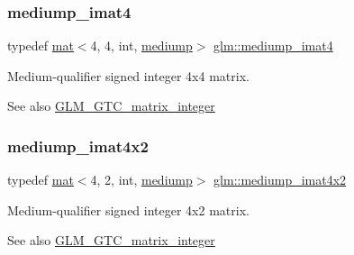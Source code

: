 \subsubsection{\texorpdfstring{mediump\+\_\+imat4}{mediump\_imat4}}
{\footnotesize\ttfamily typedef \mbox{\hyperlink{structglm_1_1mat}{mat}}$<$4, 4, int, \mbox{\hyperlink{namespaceglm_a36ed105b07c7746804d7fdc7cc90ff25a6416f3ea0c9025fb21ed50c4d6620482}{mediump}}$>$ \mbox{\hyperlink{group__gtc__matrix__integer_ga3ce415f7039ec7f1ad5bffa14d226e80}{glm\+::mediump\+\_\+imat4}}}

Medium-\/qualifier signed integer 4x4 matrix. \begin{DoxySeeAlso}{See also}
\mbox{\hyperlink{group__gtc__matrix__integer}{G\+L\+M\+\_\+\+G\+T\+C\+\_\+matrix\+\_\+integer}} 
\end{DoxySeeAlso}
\mbox{\label{group__gtc__matrix__integer_ga536fe339834f7e764672c22c63ec543b}} 
\subsubsection{\texorpdfstring{mediump\+\_\+imat4x2}{mediump\_imat4x2}}
{\footnotesize\ttfamily typedef \mbox{\hyperlink{structglm_1_1mat}{mat}}$<$4, 2, int, \mbox{\hyperlink{namespaceglm_a36ed105b07c7746804d7fdc7cc90ff25a6416f3ea0c9025fb21ed50c4d6620482}{mediump}}$>$ \mbox{\hyperlink{group__gtc__matrix__integer_ga536fe339834f7e764672c22c63ec543b}{glm\+::mediump\+\_\+imat4x2}}}

Medium-\/qualifier signed integer 4x2 matrix. \begin{DoxySeeAlso}{See also}
\mbox{\hyperlink{group__gtc__matrix__integer}{G\+L\+M\+\_\+\+G\+T\+C\+\_\+matrix\+\_\+integer}} 
\end{DoxySeeAlso}
\mbox{\label{group__gtc__matrix__integer_ga213644b63e6ee8ac783fd9a75e3c5abb}} 
